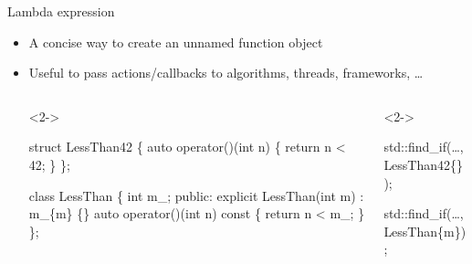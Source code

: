 \begin{frame}[fragile]{Lambda expression}

  \begin{itemize}
  \item A concise way to create an unnamed function object
  \item Useful to pass actions/callbacks to algorithms, threads, frameworks,
    \ldots

  \begin{columns}[t]

    \begin{column}{.5\textwidth}
      \begin{codeblock}<2->{
struct LessThan42 \{
  auto operator()(int n)
  \{
    return n < 42;
  \}
\};

class LessThan \{
  int m\_;
 public:
  explicit LessThan(int m)
    : m\_\{m\} \{\}
  auto operator()(int n) const
  \{
    return n < m_;
  \}
\};}\end{codeblock}

    \end{column}

    \begin{column}{.5\textwidth}
      \begin{codeblock}<2->{
std::find_if(\ldots, LessThan42\{\});


std::find_if(\ldots, LessThan\{m\});

}\end{codeblock}
      \end{column}

    \end{columns}

  \end{itemize}

\end{frame}

